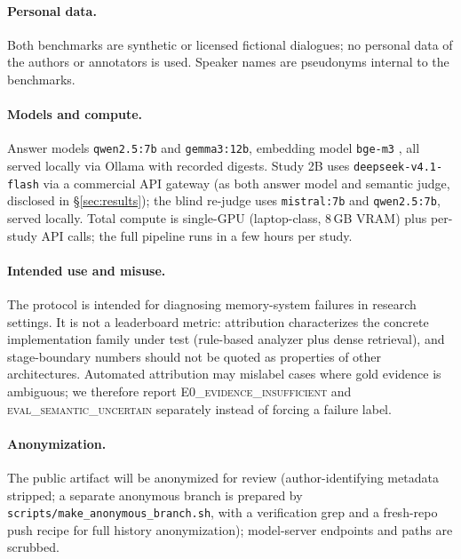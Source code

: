 \documentclass[11pt]{article}
\newcommand{\ezero}{E0\textsc{\_evidence\_insufficient}}
\newcommand{\evaluncertain}{\textsc{eval\_semantic\_uncertain}}
\begin{document}
\paragraph{Personal data.} Both benchmarks are synthetic or licensed
fictional dialogues; no personal data of the authors or annotators is
used. Speaker names are pseudonyms internal to the benchmarks.

\paragraph{Models and compute.} Answer models \texttt{qwen2.5:7b}
\cite{qwen25} and \texttt{gemma3:12b}, embedding model \texttt{bge-m3}
\cite{bge-m3}, all served locally via Ollama with recorded digests.
Study 2B uses \texttt{deepseek-v4.1-flash} via a commercial API gateway
(as both answer model and semantic judge, disclosed in
\S\ref{sec:results}); the blind re-judge uses \texttt{mistral:7b} and
\texttt{qwen2.5:7b}, served locally. Total
compute is single-GPU (laptop-class, 8\,GB VRAM) plus per-study API
calls; the full pipeline runs in a few hours per study.

\paragraph{Intended use and misuse.} The protocol is intended for
diagnosing memory-system failures in research settings. It is not a
leaderboard metric: attribution characterizes the concrete implementation
family under test (rule-based analyzer plus dense retrieval), and
stage-boundary numbers should not be quoted as properties of other
architectures. Automated attribution may mislabel cases where gold
evidence is ambiguous; we therefore report \ezero{} and \evaluncertain{}
separately instead of forcing a failure label.

\paragraph{Anonymization.} The public artifact will be anonymized for
review (author-identifying metadata stripped; a separate anonymous branch
is prepared by \texttt{scripts/make\_anonymous\_branch.sh}, with a
verification grep and a fresh-repo push recipe for full history
anonymization); model-server endpoints and paths are scrubbed.
\end{document}
